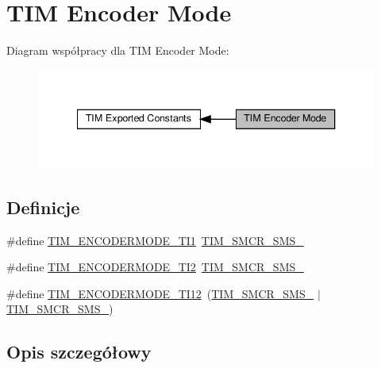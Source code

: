 \hypertarget{group___t_i_m___encoder___mode}{}\section{T\+IM Encoder Mode}
\label{group___t_i_m___encoder___mode}
Diagram współpracy dla T\+IM Encoder Mode\+:\nopagebreak
\begin{figure}[H]
\begin{center}
\leavevmode
\includegraphics[width=340pt]{group___t_i_m___encoder___mode}
\end{center}
\end{figure}
\subsection*{Definicje}
\begin{DoxyCompactItemize}
\item 
\#define \hyperlink{group___t_i_m___encoder___mode_gaff047abefa78b0f0a7bbd0f648905d7d}{T\+I\+M\+\_\+\+E\+N\+C\+O\+D\+E\+R\+M\+O\+D\+E\+\_\+\+T\+I1}~\hyperlink{group___peripheral___registers___bits___definition_ga7d1ebece401aeb12abd466d2eafa78b2}{T\+I\+M\+\_\+\+S\+M\+C\+R\+\_\+\+S\+M\+S\+\_}
\item 
\#define \hyperlink{group___t_i_m___encoder___mode_ga9166e985a35358cb3ed942c2a36e018d}{T\+I\+M\+\_\+\+E\+N\+C\+O\+D\+E\+R\+M\+O\+D\+E\+\_\+\+T\+I2}~\hyperlink{group___peripheral___registers___bits___definition_gaa980a3121ab6cda5a4a42b959da8421e}{T\+I\+M\+\_\+\+S\+M\+C\+R\+\_\+\+S\+M\+S\+\_}
\item 
\#define \hyperlink{group___t_i_m___encoder___mode_ga8046f1021dc578551fcff88891239e67}{T\+I\+M\+\_\+\+E\+N\+C\+O\+D\+E\+R\+M\+O\+D\+E\+\_\+\+T\+I12}~(\hyperlink{group___peripheral___registers___bits___definition_gaa980a3121ab6cda5a4a42b959da8421e}{T\+I\+M\+\_\+\+S\+M\+C\+R\+\_\+\+S\+M\+S\+\_} $\vert$ \hyperlink{group___peripheral___registers___bits___definition_ga7d1ebece401aeb12abd466d2eafa78b2}{T\+I\+M\+\_\+\+S\+M\+C\+R\+\_\+\+S\+M\+S\+\_})
\end{DoxyCompactItemize}


\subsection{Opis szczegółowy}


